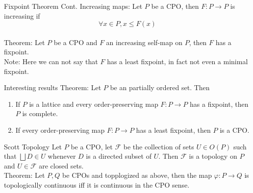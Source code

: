 \documentclass[%
pdf,
colorBG,
slideColor,
azure
]{prosper}
\begin{document}
\begin{slide}{Fixpoint Theorem Cont.}
Increasing maps: Let $P$ be a CPO, then $F : P \rightarrow P$ is increasing if 
\[ \forall x \in P, x \leq F(x) \]\\
\bigskip
Theorem: Let $P$ be a CPO and $F$ an increasing self-map on $P$, then $F$ has a fixpoint.\\
\bigskip
Note: Here we can not say that $F$ has a least fixpoint, in fact not even a minimal fixpoint.
\end{slide}

\begin{slide}{Interesting results}
Theorem: Let $P$ be an partially ordered set. Then
\begin{enumerate}
\item If $P$ is a lattice and every order-preserving map $F:P\rightarrow P$ has a fixpoint, then $P$ is complete.
\item If every order-preserving map $F:P \rightarrow P$ has a least fixpoint, then $P$ is a CPO.
\end{enumerate}
\end{slide}

\begin{slide}{Scott Topology}
Let $P$ be a CPO, let $\mathcal{F}$ be the collection of sets $U \in O(P)$ such that $\bigsqcup D \in U$ whenever $D$ is a directed subset of $U$. Then $\mathcal{F}$ is a topology on $P$ and $U \in \mathcal{F}$ are closed sets.\\
\bigskip
Theorem: Let $P, Q$ be CPOs and topplogized as above, then the map $\varphi :P \rightarrow Q$ is topologically continuous iff it is continuous in the CPO sense.
\end{slide} 
\end{document}
